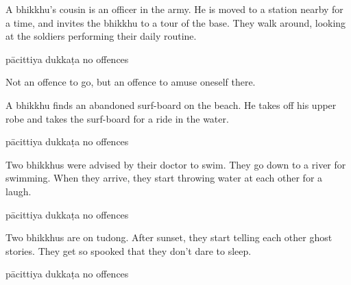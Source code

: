 \begin{exam}{\autoExamName}
\begin{problem*}
\begin{parts}
      \bigskip

      \item A bhikkhu's cousin is an officer in the army. He is moved to a
      station nearby for a time, and invites the bhikkhu to a tour of the base.
      They walk around, looking at the soldiers performing their daily routine.

      \bigskip

      \begin{answers}{3}
        \bChoices
         pācittiya\eAns
         dukkaṭa\eAns
         no offences\eAns
        \eChoices
      \end{answers}

      \begin{solution}
        Not an offence to go, but an offence to amuse oneself there.
      \end{solution}

      \bigskip

      \item A bhikkhu finds an abandoned surf-board on the beach. He takes off his upper
      robe and takes the surf-board for a ride in the water.

      \bigskip

      \begin{answers}{3}
        \bChoices
         pācittiya\eAns
         dukkaṭa\eAns
         no offences\eAns
        \eChoices
      \end{answers}

      \bigskip

      \item Two bhikkhus were advised by their doctor to swim. They go down to a
      river for swimming. When they arrive, they start throwing water at each
      other for a laugh.

      \bigskip

      \begin{answers}{3}
        \bChoices
         pācittiya\eAns
         dukkaṭa\eAns
         no offences\eAns
        \eChoices
      \end{answers}

      \bigskip

      \item Two bhikkhus are on tudong. After sunset, they start telling each
      other ghost stories. They get so spooked that they don't dare to sleep.

      \bigskip

      \begin{answers}{3}
        \bChoices
         pācittiya\eAns
         dukkaṭa\eAns
         no offences\eAns
        \eChoices
      \end{answers}


\end{parts}
\end{problem*}
\end{exam}
